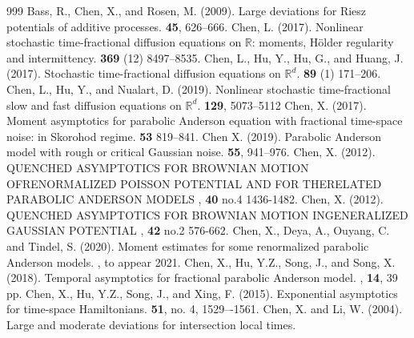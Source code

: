 \documentclass[a4paper,11pt]{article}
\numberwithin{equation}{section}
\theoremstyle{plain}
\theoremstyle{definition}
\newcommand{\R}{\mathbb{R}}
\numberwithin{NQ}{section}
\numberwithin{LQ}{section}
\numberwithin{ZQ}{section}
\begin{document}
\begin{thebibliography}{999}
	Bass, R., Chen, X., and Rosen, M. (2009).
	\newblock Large deviations for Riesz potentials of additive processes.
	 \textbf{45}, 626--666.
	Chen, L. (2017).
	\newblock Nonlinear stochastic time-fractional diffusion equations on $\R$: moments, H\"older regularity and intermittency.
	 \textbf{369} (12) 8497--8535.
	Chen, L., Hu, Y., Hu, G., and Huang, J. (2017).
	\newblock Stochastic time-fractional diffusion equations on $\R^d$.
	 \textbf{89} (1) 171--206.
	Chen, L., Hu, Y., and Nualart, D. (2019).
	\newblock Nonlinear stochastic time-fractional slow and fast diffusion equations on $\R^d$.
	 \textbf{129}, 5073--5112
	Chen, X. (2017).
	\newblock Moment asymptotics for parabolic Anderson equation with fractional time-space noise: in Skorohod regime.
	 {\bf 53} 819--841.
	Chen X. (2019).
	\newblock Parabolic Anderson model with rough or critical Gaussian noise.
	 \textbf{55}, 941--976.
	Chen, X. (2012).
	\newblock QUENCHED ASYMPTOTICS FOR BROWNIAN MOTION OFRENORMALIZED POISSON POTENTIAL AND FOR THERELATED PARABOLIC ANDERSON MODELS
	, \textbf{40} no.4 1436-1482.
	Chen, X. (2012).
	\newblock QUENCHED ASYMPTOTICS FOR BROWNIAN MOTION INGENERALIZED GAUSSIAN POTENTIAL
	, \textbf{42} no.2 576-662.
	Chen, X., Deya, A., Ouyang, C. and Tindel, S. (2020).
	\newblock Moment estimates for some renormalized parabolic Anderson models.
	, to appear 2021.
	Chen, X., Hu, Y.Z., Song, J., and Song, X. (2018).
	\newblock Temporal asymptotics for fractional parabolic Anderson model.
	, {\bf 14}, 39 pp.
	Chen, X., Hu, Y.Z., Song, J., and Xing, F. (2015).
	\newblock Exponential asymptotics for time-space Hamiltonians.
	 {\bf 51}, no. 4, 1529–-1561.
	Chen, X. and Li, W. (2004).
	\newblock Large and moderate deviations for intersection local times.

\end{thebibliography}
\end{document}
